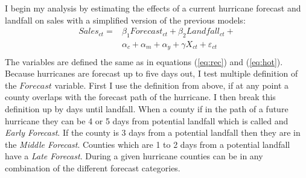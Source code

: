 \documentclass{article}
\begin{document}
I begin my analysis by estimating the effects of a current hurricane forecast and landfall on sales with a simplified version of the previous models:
\begin{equation}
    \begin{split}
       Sales_{ct} = &\beta_1 Forecast_{ct} + \beta_2 Landfall_{ct} +\\ 
			& \alpha_c + \alpha_m + \alpha_y + \gamma X_{ct} + \varepsilon_{ct}\\
			\label{eq:simple}
    \end{split}
\end{equation}
The variables are defined the same as in equations (\ref{eq:rec}) and (\ref{eq:hot}). Because hurricanes are forecast up to five days out, I test multiple definition of the $Forecast$ variable. First I use the definition from above, if at any point a county overlaps with the forecast path of the hurricane. I then break this definition up by days until landfall. When a county if in the path of a future hurricane they can be 4 or 5 days from potential landfall which is called and \emph{Early Forecast}. If the county is 3 days from a potential landfall then they are in the \emph{Middle Forecast}. Counties which are 1 to 2 days from a potential landfall have a \emph{Late Forecast}. During a given hurricane counties can be in any combination of the different forecast categories.
\end{document}
